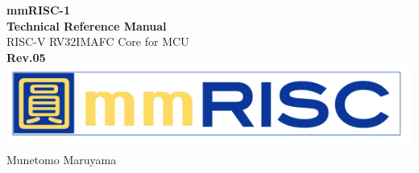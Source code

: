 \begin{titlepage}
    \begin{center}
        \vspace*{5cm}
        {\Huge \textbf{mmRISC-1}}\\[1cm]
        {\Huge \textbf{Technical Reference Manual}}\\[2cm]
        {\LARGE{RISC-V RV32IMAFC Core for MCU}}\\[3cm]
        {\LARGE \textbf{Rev.05}}\\[3cm]
        \includegraphics[width=0.75\columnwidth]{./Logo/mmRISC_Logo.png}\\[2cm]
        {\LARGE{Munetomo Maruyama}}\\[0.5cm]
    \end{center} 
\end{titlepage}
